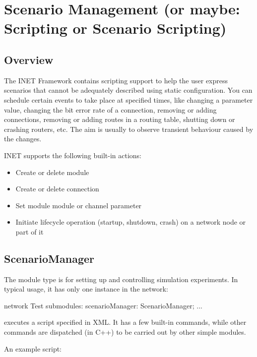 \chapter{Scenario Management (or maybe: Scripting or Scenario Scripting)}
\label{cha:scenario-management}

\section{Overview}

The INET Framework contains scripting support to help the user express 
scenarios that cannot be adequately described using static configuration.
You can schedule certain events to take place at specified times,
like changing a parameter value, changing the bit error rate of
a connection, removing or adding connections, removing or adding 
routes in a routing table, shutting down or crashing routers, etc. 
The aim is usually to observe transient behaviour caused by the changes.

INET supports the following built-in actions:

\begin{itemize}
  \item Create or delete module
  \item Create or delete connection
  \item Set module module or channel parameter
  \item Initiate lifecycle operation (startup, shutdown, crash) 
    on a network node or part of it
\end{itemize}

\section{ScenarioManager}

The  module type is for setting up and controlling
simulation experiments. In typical usage, it has only one instance in the
network:

\begin{ned}
network Test {
    submodules:
        scenarioManager: ScenarioManager;
        ...
}
\end{ned}

 executes a script specified in XML. It has a few
built-in commands, while other commands are dispatched (in C++) to be 
carried out by other simple modules.

An example script:

